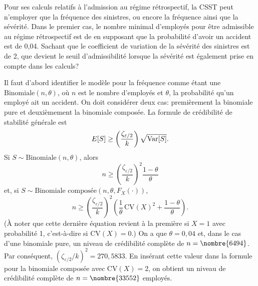 \begin{exercice}
  Pour ses calculs relatifs à l'admission au régime rétrospectif, la
  CSST peut n'employer que la fréquence des sinistres, ou encore la
  fréquence ainsi que la sévérité. Dans le premier cas, le nombre
  minimal d'employés pour être admissible au régime rétrospectif est
  de  en supposant que la probabilité d'avoir un accident
  est de 0,04.  Sachant que le coefficient de variation de la sévérité
  des sinistres est de 2, que devient le seuil d'admissibilité
  lorsque la sévérité est également prise en compte dans les calculs?
  \begin{rep}
  \end{rep}
  \begin{sol}
    Il faut d'abord identifier le modèle pour la fréquence comme étant
    une $\text{Binomiale}(n, \theta)$, où $n$ est le nombre d'employés
    et $\theta$, la probabilité qu'un employé ait un accident. On doit
    considérer deux cas: premièrement la binomiale pure et deuxièmement
    la binomiale composée. La formule de crédibilité de stabilité
    générale est
    \begin{displaymath}
      E [ S ] \geq
      \left(
        \frac{\zeta_{\varepsilon/2}}{k}
      \right) \sqrt{\operatorname{Var} [ S ]}.
    \end{displaymath}
    Si $S \sim \text{Binomiale}(n, \theta)$, alors
    \begin{displaymath}
      n \geq
      \left(
        \frac{\zeta_{\varepsilon/2}}{k}
      \right)^2 \frac{1 - \theta}{\theta}
    \end{displaymath}
    et, si $S \sim \text{Binomiale composée}(n, \theta, F_X(\cdot))$,
    \begin{displaymath}
      n \geq
      \left(
        \frac{\zeta_{\varepsilon/2}}{k}
      \right)^2
      \left(
        \frac{1}{\theta}\, \mathrm{CV}(X)^2 +
        \frac{1 - \theta}{\theta}
      \right).
    \end{displaymath}
    (À noter que cette dernière équation revient à la première si $X =
    1$ avec probabilité 1, c'est-à-dire si $\mathrm{CV}(X) = 0$.) On a
    que $\theta = 0,04$ et, dans le cas d'une binomiale pure, un
    niveau de crédibilité complète de $n = \nombre{6494}$. Par
    conséquent, $(\zeta_{\varepsilon/2}/k)^2 = 270,5833$. En insérant
    cette valeur dans la formule pour la binomiale composée avec
    $\mathrm{CV}(X) = 2$, on obtient un niveau de crédibilité complète
    de $n = \nombre{33552}$ employés.
  \end{sol}
\end{exercice}

